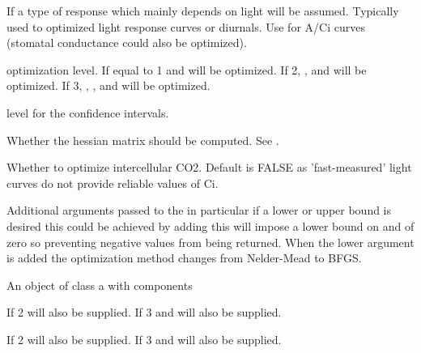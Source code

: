 \documentclass[letterpaper]{book}
\begin{document}
\begin{Arguments}
\begin{ldescription}
\item[\code{curve.kind}] If  a type of response which
mainly depends on light will be assumed. Typically used
to optimized light response curves or diurnals. Use
 for A/Ci curves (stomatal conductance could
also be optimized).

\item[\code{op.level}] optimization level. If equal to 1
 and  will be optimized. If 2,
,  and  will be
optimized. If 3, , , 
and  will be optimized.

\item[\code{level}] level for the confidence intervals.

\item[\code{hessian}] Whether the hessian matrix should be
computed. See .

\item[\code{op.ci}] Whether to optimize intercellular CO2.
Default is FALSE as 'fast-measured' light curves do not
provide reliable values of Ci.

\item[\code{list()}] Additional arguments passed to the
 in particular if a lower or upper
bound is desired this could be achieved by adding
 this will impose a lower bound on
 and  of zero so preventing
negative values from being returned. When the lower
argument is added the optimization method changes from
Nelder-Mead to BFGS.
\end{ldescription}
\end{Arguments}
%
\begin{Value}
An object of class  a 
with components

If  2  will also be supplied.
If  3  and  will
also be supplied.

If  2  will also be supplied.  If
 3  and  will also
be supplied.
\end{Value}
%
\begin{SeeAlso}\relax
{} 
\end{SeeAlso}
%
\begin{Examples}
\end{Examples}
\end{document}
